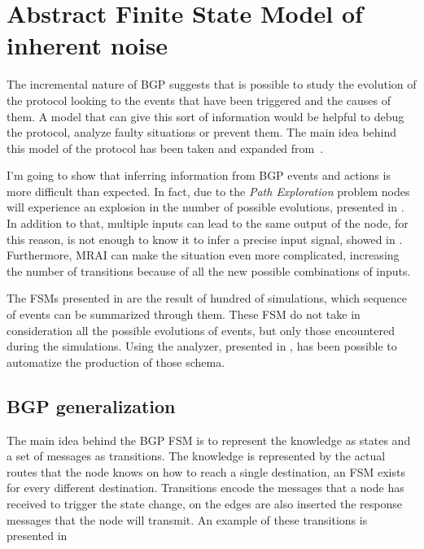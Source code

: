\chapter[Abstract Finite State Model of inherent noise]{Abstract Finite State Model of \\inherent noise}
\label{cha:bgp_fsm}

The incremental nature of \ac{BGP} suggests that is possible to study the
evolution of the protocol looking to the events that have been triggered
and the causes of them.
A model that can give this sort of information would be helpful to debug
the protocol, analyze faulty situations or prevent them.
The main idea behind this model of the protocol has been taken and
expanded from~\cite{griffinFSM}.

I'm going to show that inferring information from \ac{BGP} events and actions
is more difficult than expected.
In fact, due to the \textit{Path Exploration} problem
nodes will experience an explosion in the number of possible evolutions,
presented in .
In addition to that, multiple inputs can lead to the same output of the node,
for this reason, is not enough to know it to infer a precise input signal,
showed in .
Furthermore, \ac{MRAI} can make the situation even more complicated, increasing
the number of transitions because of all the new possible combinations of
inputs.

The \ac{FSM}s presented in  are
the result of hundred of simulations, which sequence of events can be summarized
through them.
These FSM do not take in consideration all the possible evolutions of events,
but only those encountered during the simulations.
Using the analyzer, presented in , has been possible
to automatize the production of those schema.

\section{BGP generalization}
\label{sec:bgp_generalization}

The main idea behind the \ac{BGP} \ac{FSM} is to represent the knowledge as
states and a set of messages as transitions.
The knowledge is represented by the actual routes that the node knows on how
to reach a single destination, an \ac{FSM} exists for every different
destination.
Transitions encode the messages that a node has received to trigger the state change,
on the edges are also inserted the response messages that the node will transmit.
An example of these transitions is presented in 

